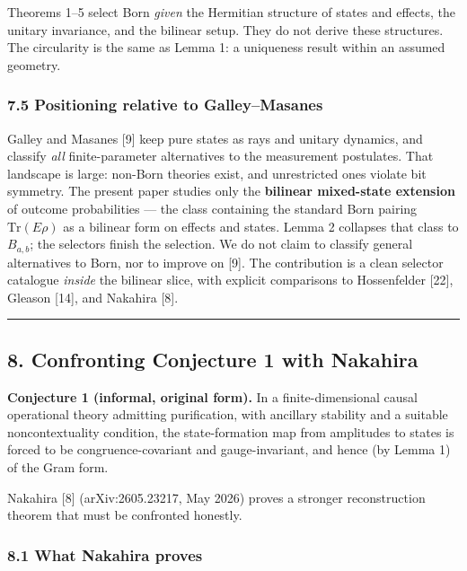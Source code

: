 \documentclass[
]{article}
\begin{document}
Theorems 1--5 select Born \emph{given} the Hermitian structure of states
and effects, the unitary invariance, and the bilinear setup. They do not
derive these structures. The circularity is the same as Lemma 1: a
uniqueness result within an assumed geometry.

\subsubsection{7.5 Positioning relative to
Galley--Masanes}\label{positioning-relative-to-galleymasanes}

Galley and Masanes {[}9{]} keep pure states as rays and unitary
dynamics, and classify \emph{all} finite-parameter alternatives to the
measurement postulates. That landscape is large: non-Born theories
exist, and unrestricted ones violate bit symmetry. The present paper
studies only the \textbf{bilinear mixed-state extension} of outcome
probabilities --- the class containing the standard Born pairing
\(\mathrm{Tr}(E\rho)\) as a bilinear form on effects and states. Lemma 2
collapses that class to \(B_{a,b}\); the selectors finish the selection.
We do not claim to classify general alternatives to Born, nor to improve
on {[}9{]}. The contribution is a clean selector catalogue \emph{inside}
the bilinear slice, with explicit comparisons to Hossenfelder {[}22{]},
Gleason {[}14{]}, and Nakahira {[}8{]}.

\begin{center}\rule{0.5\linewidth}{0.5pt}\end{center}

\subsection{8. Confronting Conjecture 1 with
Nakahira}\label{confronting-conjecture-1-with-nakahira}

\textbf{Conjecture 1 (informal, original form).} In a finite-dimensional
causal operational theory admitting purification, with ancillary
stability and a suitable noncontextuality condition, the state-formation
map from amplitudes to states is forced to be congruence-covariant and
gauge-invariant, and hence (by Lemma 1) of the Gram form.

Nakahira {[}8{]} (arXiv:2605.23217, May 2026) proves a stronger
reconstruction theorem that must be confronted honestly.

\subsubsection{8.1 What Nakahira proves}\label{what-nakahira-proves}
\end{document}

